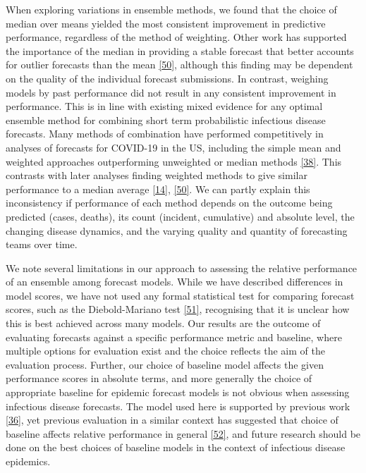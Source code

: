 \documentclass[
]{article}
\begin{document}
When exploring variations in ensemble methods, we found that the choice of median over means yielded the most consistent improvement in predictive performance, regardless of the method of weighting. Other work has supported the importance of the median in providing a stable forecast that better accounts for outlier forecasts than the mean \protect\hyperlink{ref-brooksComparingEnsembleApproaches2020}{{[}50{]}}, although this finding may be dependent on the quality of the individual forecast submissions. In contrast, weighing models by past performance did not result in any consistent improvement in performance. This is in line with existing mixed evidence for any optimal ensemble method for combining short term probabilistic infectious disease forecasts. Many methods of combination have performed competitively in analyses of forecasts for COVID-19 in the US, including the simple mean and weighted approaches outperforming unweighted or median methods \protect\hyperlink{ref-taylorCombiningProbabilisticForecasts2021}{{[}38{]}}. This contrasts with later analyses finding weighted methods to give similar performance to a median average \protect\hyperlink{ref-rayEnsembleForecastsCoronavirus2020e}{{[}14{]}}, \protect\hyperlink{ref-brooksComparingEnsembleApproaches2020}{{[}50{]}}. We can partly explain this inconsistency if performance of each method depends on the outcome being predicted (cases, deaths), its count (incident, cumulative) and absolute level, the changing disease dynamics, and the varying quality and quantity of forecasting teams over time.

We note several limitations in our approach to assessing the relative performance of an ensemble among forecast models. While we have described differences in model scores, we have not used any formal statistical test for comparing forecast scores, such as the Diebold-Mariano test \protect\hyperlink{ref-dieboldComparingPredictiveAccuracy1995}{{[}51{]}}, recognising that it is unclear how this is best achieved across many models. Our results are the outcome of evaluating forecasts against a specific performance metric and baseline, where multiple options for evaluation exist and the choice reflects the aim of the evaluation process. Further, our choice of baseline model affects the given performance scores in absolute terms, and more generally the choice of appropriate baseline for epidemic forecast models is not obvious when assessing infectious disease forecasts. The model used here is supported by previous work \protect\hyperlink{ref-cramerEvaluationIndividualEnsemble2021}{{[}36{]}}, yet previous evaluation in a similar context has suggested that choice of baseline affects relative performance in general \protect\hyperlink{ref-bracherNationalSubnationalShortterm2021}{{[}52{]}}, and future research should be done on the best choices of baseline models in the context of infectious disease epidemics.
\end{document}
